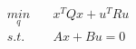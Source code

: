 \documentclass[preview]{standalone}
\begin{document}
\begin{align*}
\underset{q}{min} \quad &x^TQx + u^T R u \\ s.t. \quad &Ax + Bu = 0
\end{align*}
\end{document}
